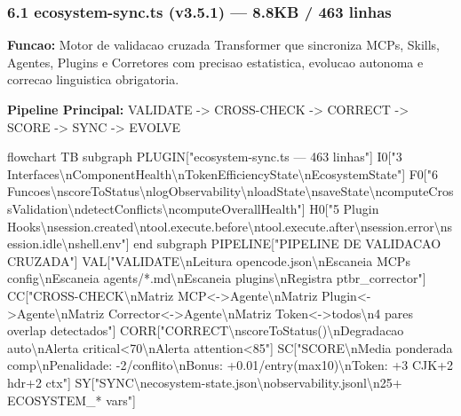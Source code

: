 \documentclass[
  12pt,
]{article}
\newenvironment{Shaded}{}{}
\newcommand{\NormalTok}[1]{#1}
\begin{document}
\subsubsection{6.1 ecosystem-sync.ts (v3.5.1) --- 8.8KB / 463
linhas}\label{ecosystem-sync.ts-v3.5.1-8.8kb-463-linhas}

\textbf{Funcao:} Motor de validacao cruzada Transformer que sincroniza
MCPs, Skills, Agentes, Plugins e Corretores com precisao estatistica,
evolucao autonoma e correcao linguistica obrigatoria.

\textbf{Pipeline Principal:} VALIDATE -\textgreater{} CROSS-CHECK
-\textgreater{} CORRECT -\textgreater{} SCORE -\textgreater{} SYNC
-\textgreater{} EVOLVE

\begin{Shaded}
\begin{Highlighting}[]
\NormalTok{flowchart TB}
\NormalTok{subgraph PLUGIN["ecosystem{-}sync.ts — 463 linhas"]}
\NormalTok{I0["3 Interfaces\textbackslash{}nComponentHealth\textbackslash{}nTokenEfficiencyState\textbackslash{}nEcosystemState"]}
\NormalTok{F0["6 Funcoes\textbackslash{}nscoreToStatus\textbackslash{}nlogObservability\textbackslash{}nloadState\textbackslash{}nsaveState\textbackslash{}ncomputeCrossValidation\textbackslash{}ndetectConflicts\textbackslash{}ncomputeOverallHealth"]}
\NormalTok{H0["5 Plugin Hooks\textbackslash{}nsession.created\textbackslash{}ntool.execute.before\textbackslash{}ntool.execute.after\textbackslash{}nsession.error\textbackslash{}nsession.idle\textbackslash{}nshell.env"]}
\NormalTok{end}
\NormalTok{subgraph PIPELINE["PIPELINE DE VALIDACAO CRUZADA"]}
\NormalTok{VAL["VALIDATE\textbackslash{}nLeitura opencode.json\textbackslash{}nEscaneia MCPs config\textbackslash{}nEscaneia agents/*.md\textbackslash{}nEscaneia plugins\textbackslash{}nRegistra ptbr\_corrector"]}
\NormalTok{CC["CROSS{-}CHECK\textbackslash{}nMatriz MCP\textless{}{-}\textgreater{}Agente\textbackslash{}nMatriz Plugin\textless{}{-}\textgreater{}Agente\textbackslash{}nMatriz Corrector\textless{}{-}\textgreater{}Agente\textbackslash{}nMatriz Token\textless{}{-}\textgreater{}todos\textbackslash{}n4 pares overlap detectados"]}
\NormalTok{CORR["CORRECT\textbackslash{}nscoreToStatus()\textbackslash{}nDegradacao auto\textbackslash{}nAlerta critical\textless{}70\textbackslash{}nAlerta attention\textless{}85"]}
\NormalTok{SC["SCORE\textbackslash{}nMedia ponderada comp\textbackslash{}nPenalidade: {-}2/conflito\textbackslash{}nBonus: +0.01/entry(max10)\textbackslash{}nToken: +3 CJK+2 hdr+2 ctx"]}
\NormalTok{SY["SYNC\textbackslash{}necosystem{-}state.json\textbackslash{}nobservability.jsonl\textbackslash{}n25+ ECOSYSTEM\_* vars"]}

\end{Highlighting}
\end{Shaded}
\end{document}
